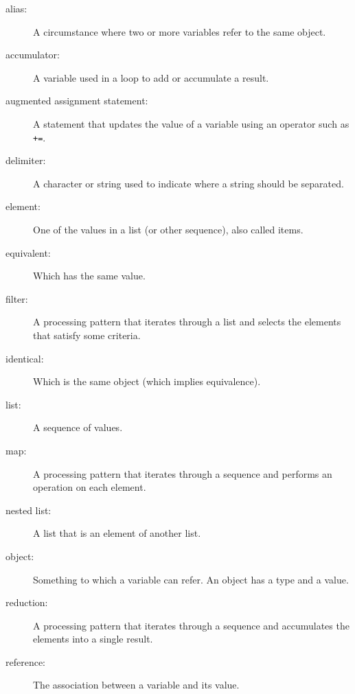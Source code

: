 \begin{description}

\item[alias:] A circumstance where two or more variables refer to the same object.

\item[accumulator:] A variable used in a loop to add or accumulate a result.

\item[augmented assignment statement:] A statement that updates the value of a variable using an operator such as \verb"+=".

\item[delimiter:] A character or string used to indicate where a string should be separated.

\item[element:] One of the values in a list (or other sequence), also called items.

\item[equivalent:] Which has the same value.

\item[filter:] A processing pattern that iterates through a list and selects the elements that satisfy some criteria.

\item[identical:] Which is the same object (which implies equivalence).

\item[list:] A sequence of values.

\item[map:] A processing pattern that iterates through a sequence and performs an operation on each element.

\item[nested list:] A list that is an element of another list.

\item[object:] Something to which a variable can refer. An object has a type and a value.

\item[reduction:] A processing pattern that iterates through a sequence and accumulates the elements into a single result.

\item[reference:] The association between a variable and its value.

\end{description}


